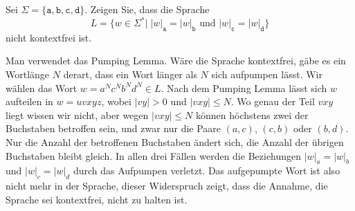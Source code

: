 Sei $\Sigma=\{\texttt{a},\texttt{b},\texttt{c},\texttt{d}\}$.
Zeigen Sie, dass die Sprache
\[
L=\{w\in\Sigma^*|\;\text{$|w|_\texttt{a}=|w|_\texttt{b}$ und $|w|_\texttt{c}=|w|_\texttt{d}$}\}
\]
nicht kontextfrei ist.

\begin{loesung}
Man verwendet das Pumping Lemma.
Wäre die Sprache kontextfrei,
gäbe
es ein Wortlänge $N$ derart, dass ein Wort länger als $N$ sich
aufpumpen lässt.
Wir wählen das Wort $w=a^Nc^Nb^Nd^N\in L$.
Nach dem Pumping
Lemma lässt sich $w$ aufteilen in
$w = uvxyz$, wobei $|vy|>0$ und $|vxy|\le N$.
Wo genau der Teil
$vxy$ liegt wissen wir nicht, aber wegen $|vxy|\le N$ können
höchstens zwei der Buchstaben betroffen sein, und
zwar nur die Paare $(a,c)$, $(c,b)$ oder $(b,d)$.
Nur die Anzahl
der betroffenen Buchstaben ändert sich, die Anzahl der übrigen
Buchstaben bleibt gleich.
In allen drei Fällen werden die
Beziehungen $|w|_a=|w|_b$ und $|w|_c=|w|_d$ durch das Aufpumpen verletzt.
Das aufgepumpte Wort ist also nicht mehr in der Sprache, dieser Widerspruch
zeigt, dass die Annahme, die Sprache sei kontextfrei, nicht zu halten ist.
\end{loesung}
